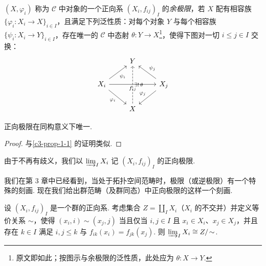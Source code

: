 \begin{definition}\label{c5-def-3-5}
$(X,\varphi_i)$ 称为 $\mathscr{C}$ 中对象的一个正向系 $(X_i,f_{ij})_I$ 的\emph{余极限}，若 $X$ 配有相容族 $\{\varphi_i:X_i\to X\}_{i\in I}$，且满足下列泛性质：对每个对象 $Y$ 与每个相容族 $\{\psi_i:X_i\to Y\}_{i\in I}$，存在唯一的 $\mathscr{C}$ 中态射 $\theta:Y\to X$\footnote{原文即如此；按图示与余极限的泛性质，此处应为 $\theta:X\to Y$.}，使得下图对一切 $i\leq j\in I$ 交换：
\[
\begin{tikzcd}
& Y & \\
X_i \arrow[ur,"\psi_i"'] \arrow[dr,"\varphi_i"'] \arrow[rr,"f_{ij}"'] & & X_j \arrow[ul,"\psi_j"'] \arrow[dl,"\varphi_j"'] \\
& X \arrow[uu,dashed,"{\exists!\,\theta}"'] &
\end{tikzcd}
\]
\end{definition}

\begin{proposition}\label{c5-prop-3-3}
正向极限在同构意义下唯一.
\end{proposition}

\begin{proof}
与\autoref{c3-prop-1-1} 的证明类似.
\end{proof}

\begin{notation}\label{c5-not-3-6}
由于不再有歧义，我们以 $\varinjlim_I X_i$ 记 $(X_i,f_{ij})_I$ 的正向极限.
\end{notation}

我们在第 $3$ 章中已经看到，当处于拓扑空间范畴时，极限（或逆极限）有一个特殊的刻画. 现在我们给出群范畴（及群同态）中正向极限的这样一个刻画.

\begin{proposition}\label{c5-prop-3-4}
设 $(X_i,f_{ij})_I$ 是一个群的正向系. 考虑集合 $Z=\coprod_I X_i$（$X_i$ 的不交并）并定义等价关系 $\sim$，使得 $(x_i,i)\sim(x_j,j)$ 当且仅当 $i,j\in I$ 且 $x_i\in X_i$、$x_j\in X_j$，并且存在 $k\in I$ 满足 $i,j\leq k$ 与 $f_{ik}(x_i)=f_{jk}(x_j)$. 则 $\varinjlim_I X_i\cong Z/\!\sim$.
\end{proposition}

